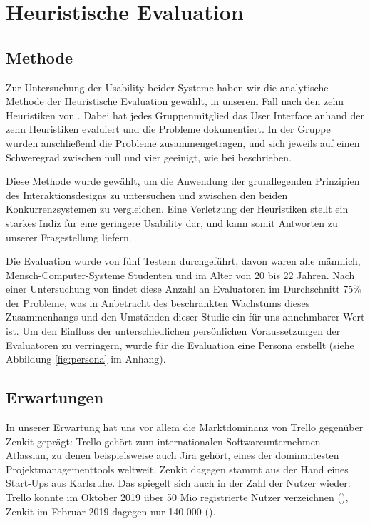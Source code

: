 \newpage
\section{Heuristische Evaluation}

\subsection{Methode}
Zur Untersuchung der Usability beider Systeme haben wir die analytische Methode der Heuristische Evaluation gewählt, in unserem Fall nach den zehn Heuristiken von \cite{nielsen199510}.
Dabei hat jedes Gruppenmitglied das User Interface anhand der zehn Heuristiken evaluiert und die Probleme dokumentiert. In der Gruppe wurden anschließend die Probleme zusammengetragen, und sich jeweils auf einen Schweregrad zwischen null und vier geeinigt, wie bei \cite{nielsen1994usability} beschrieben.

Diese Methode wurde gewählt, um die Anwendung der grundlegenden Prinzipien des Interaktionsdesigns zu untersuchen und zwischen den beiden Konkurrenzsystemen zu vergleichen. Eine Verletzung der Heuristiken stellt ein starkes Indiz für eine geringere Usability dar, und kann somit Antworten zu unserer Fragestellung liefern.

Die Evaluation wurde von fünf Testern durchgeführt, davon waren alle männlich, Mensch-Computer-Systeme Studenten und im Alter von 20 bis 22 Jahren. Nach einer Untersuchung von \cite{nielsen1995conduct} findet diese Anzahl an Evaluatoren im Durchschnitt 75\% der Probleme, was in Anbetracht des beschränkten Wachstums dieses Zusammenhangs und den Umständen dieser Studie ein für uns annehmbarer Wert ist.
Um den Einfluss der unterschiedlichen persönlichen Voraussetzungen der Evaluatoren zu verringern, wurde für die Evaluation eine Persona erstellt (siehe Abbildung \ref{fig:persona} im Anhang).




\subsection{Erwartungen}
In unserer Erwartung hat uns vor allem die Marktdominanz von Trello gegenüber Zenkit geprägt: Trello gehört zum internationalen Softwareunternehmen Atlassian, zu denen beispielsweise auch Jira gehört, eines der dominantesten Projektmanagementtools weltweit. Zenkit dagegen stammt aus der Hand eines Start-Ups aus Karlsruhe. Das spiegelt sich auch in der Zahl der Nutzer wieder: Trello konnte im Oktober 2019 über 50 Mio registrierte Nutzer verzeichnen (\cite{blogtrello}), Zenkit im Februar 2019 dagegen nur 140 000 (\cite{zenkitinterview}).

